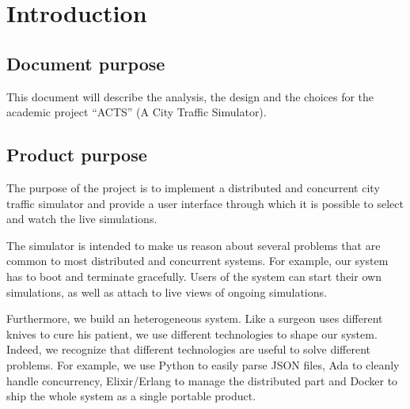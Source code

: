 \section{Introduction}
\subsection{Document purpose}
This document will describe the analysis, the design and the choices for the
academic project ``ACTS'' (A City Traffic Simulator).

\subsection{Product purpose}\label{productPurpose}
The purpose of the project is to implement a distributed and concurrent city
traffic simulator and provide a user interface through which it is possible to
select and watch the live simulations.

The simulator is intended to make us reason about several problems that
are common to most distributed and concurrent systems. For
example, our system has to boot and terminate gracefully.
Users of the system can start their own simulations, as well as attach to live
views of ongoing simulations.

Furthermore, we build an heterogeneous system.
Like a surgeon uses different knives to cure his patient, we use different
technologies to shape our system.
Indeed, we recognize that different technologies are useful to solve
different problems. For example, we use Python to easily parse JSON files,
Ada to cleanly handle concurrency, Elixir/Erlang to manage
the distributed part and Docker to ship the whole system as a
single portable product.
